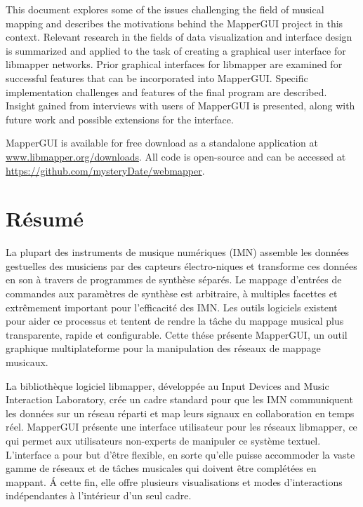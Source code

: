 \documentclass [12pt,letterpaper]{report}
\begin{document}
This document explores some of the issues challenging the field of musical mapping and describes the motivations behind the MapperGUI project in this context. Relevant research in the fields of data visualization and interface design is summarized and applied to the task of creating a graphical user interface for libmapper networks. Prior graphical interfaces for libmapper are examined for successful features that can be incorporated into MapperGUI. Specific implementation challenges and features of the final program are described. Insight gained from interviews with users of MapperGUI is presented, along with future work and possible extensions for the interface.

MapperGUI is available for free download as a standalone application at \url{www.libmapper.org/downloads}. All code is open-source and can be accessed at \url{https://github.com/mysteryDate/webmapper}.

\newpage

\section*{\centering R\'esum\'e}

La plupart des instruments de musique num\'eriques (IMN) assemble les donn\'ees gestuelles des musiciens par des capteurs \'electro-niques et transforme ces donn\'ees en son \`a travers de programmes de synthèse s\'epar\'es. Le mappage d’entr\'ees de commandes aux paramètres de synthèse est arbitraire, \`a multiples facettes et extrêmement important pour l’efficacit\'e des IMN. Les outils logiciels existent pour aider ce processus et tentent de rendre la t\^ache du mappage musical plus transparente, rapide et configurable. Cette th\'ese pr\'esente MapperGUI, un outil graphique multiplateforme pour la manipulation des r\'eseaux de mappage musicaux. 

La bibliothèque logiciel libmapper, d\'evelopp\'ee au Input Devices and Music Interaction Laboratory, cr\'ee un cadre standard pour que les IMN communiquent les donn\'ees sur un r\'eseau r\'eparti et map leurs signaux en collaboration en temps r\'eel. MapperGUI pr\'esente une interface utilisateur pour les r\'eseaux libmapper, ce qui permet aux utilisateurs non-experts de manipuler ce système textuel. L’interface a pour but d’\^etre flexible, en sorte qu’elle puisse accommoder la vaste gamme de r\'eseaux et de t\^aches musicales qui doivent \^etre compl\'et\'ees en mappant. \'A cette fin, elle offre plusieurs visualisations et modes d’interactions ind\'ependantes \`a l’int\'erieur d’un seul cadre.    
\end{document}

